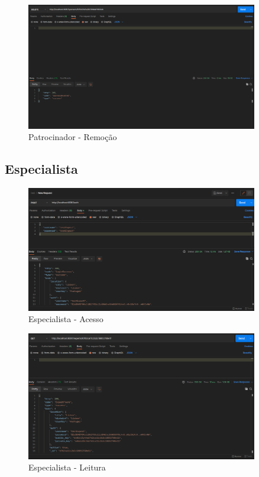 \documentclass[12pt,a4paper,final]{article}
\begin{document}
    \begin{figure}[H]
        \centering
        \includegraphics[width=0.9\textwidth]{del_sponsor}
        \caption{Patrocinador - Remoção}
        \label{fig:del_sponsor}
    \end{figure}

    \subsection{Especialista}\label{subsec:especialista}
    \begin{figure}[H]
        \centering
        \includegraphics[width=0.9\textwidth]{login_expert}
        \caption{Especialista - Acesso}
        \label{fig:login_expert}
    \end{figure}

    \begin{figure}[H]
        \centering
        \includegraphics[width=0.9\textwidth]{get_expert}
        \caption{Especialista - Leitura}
        \label{fig:get_expert}
    \end{figure}
\end{document}
